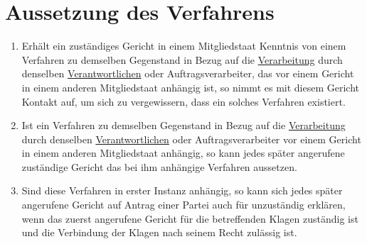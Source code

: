 \chapter{Aussetzung des Verfahrens}
\label{ch:81}


\begin{enumerate}

  \item Erhält ein zuständiges Gericht in einem Mitgliedstaat Kenntnis von einem Verfahren zu demselben Gegenstand in
   Bezug auf die \hyperref[itm:04-2]{Verarbeitung} durch denselben \hyperref[itm:04-7]{Verantwortlichen} oder Auftragsverarbeiter, das vor einem Gericht in einem
   anderen Mitgliedstaat anhängig ist, so nimmt es mit diesem Gericht Kontakt auf, um sich zu vergewissern, dass ein
   solches Verfahren existiert.
  \label{itm:81-1}

  \item Ist ein Verfahren zu demselben Gegenstand in Bezug auf die \hyperref[itm:04-2]{Verarbeitung} durch denselben \hyperref[itm:04-7]{Verantwortlichen} oder
   Auftragsverarbeiter vor einem Gericht in einem anderen Mitgliedstaat anhängig, so kann jedes später angerufene
   zuständige Gericht das bei ihm anhängige Verfahren aussetzen.
  \label{itm:81-2}

  \item Sind diese Verfahren in erster Instanz anhängig, so kann sich jedes später angerufene Gericht auf Antrag einer
   Partei auch für unzuständig erklären, wenn das zuerst angerufene Gericht für die betreffenden Klagen zuständig ist
   und die Verbindung der Klagen nach seinem Recht zulässig ist.
  \label{itm:81-3}

\end{enumerate}


